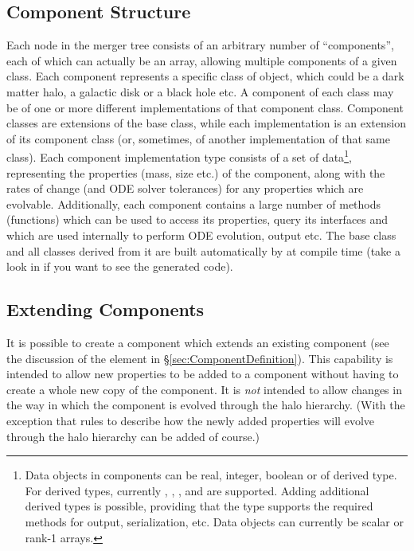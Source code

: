 \subsection{Component Structure}

Each node in the merger tree consists of an arbitrary number of ``components'', each of which can actually be an array, allowing multiple components of a given class. Each component represents a specific class of object, which could be a dark matter halo, a galactic disk or a black hole etc. A component of each class may be of one or more different implementations of that component class. Component classes are extensions of the  base class, while each implementation is an extension of its component class (or, sometimes, of another implementation of that same class). Each component implementation type consists of a set of data\footnote{Data objects in components can be real, integer, boolean or of derived type. For derived types, currently , , , and  are supported. Adding additional derived types is possible, providing that the type supports the required methods for output, serialization, etc. Data objects can currently be scalar or rank-1 arrays.}, representing the properties (mass, size etc.) of the component, along with the rates of change (and ODE solver tolerances) for any properties which are evolvable. Additionally, each component contains a large number of methods (functions) which can be used to access its properties, query its interfaces and which are used internally to perform ODE evolution, output etc. The  base class and all classes derived from it are built automatically by  at compile time (take a look in  if you want to see the generated code).

\subsection{Extending Components}

It is possible to create a component which extends an existing component (see the discussion of the  element in \S\ref{sec:ComponentDefinition}). This capability is intended to allow new properties to be added to a component without having to create a whole new copy of the component. It is \emph{not} intended to allow changes in the way in which the component is evolved through the halo hierarchy. (With the exception that rules to describe how the newly added properties will evolve through the halo hierarchy can be added of course.)

